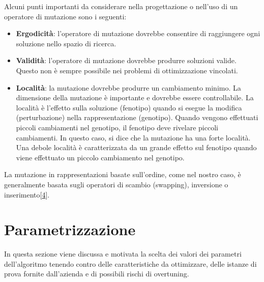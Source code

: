 Alcuni punti importanti da considerare nella progettazione o nell'uso di un operatore di mutazione sono i seguenti:

\begin{itemize}
    \item \textbf{Ergodicità}: l'operatore di mutazione dovrebbe consentire di raggiungere ogni soluzione nello spazio di ricerca.
    \item \textbf{Validità}: l'operatore di mutazione dovrebbe produrre soluzioni valide. Questo non è sempre possibile nei problemi di ottimizzazione vincolati.
    \item \textbf{Località}: la mutazione dovrebbe produrre un cambiamento minimo. La dimensione della mutazione è importante e dovrebbe essere controllabile. La località è l'effetto sulla soluzione (fenotipo) quando si esegue la modifica (perturbazione) nella rappresentazione (genotipo). Quando vengono effettuati piccoli cambiamenti nel genotipo, il fenotipo deve rivelare piccoli cambiamenti. In questo caso, si dice che la mutazione ha una forte località. Una debole località è caratterizzata da un grande effetto sul fenotipo quando viene effettuato un piccolo cambiamento nel genotipo.
\end{itemize}

La mutazione in rappresentazioni basate sull'ordine, come nel nostro caso, è generalmente basata sugli operatori di scambio (swapping), inversione o inserimento[\hyperlink{bibliografia}{4}]. 

\section{Parametrizzazione}

In questa sezione viene discussa e motivata la scelta dei valori dei parametri dell'algoritmo tenendo contro delle caratteristiche da ottimizzare, delle istanze di prova fornite dall'azienda e di possibili rischi di overtuning.

